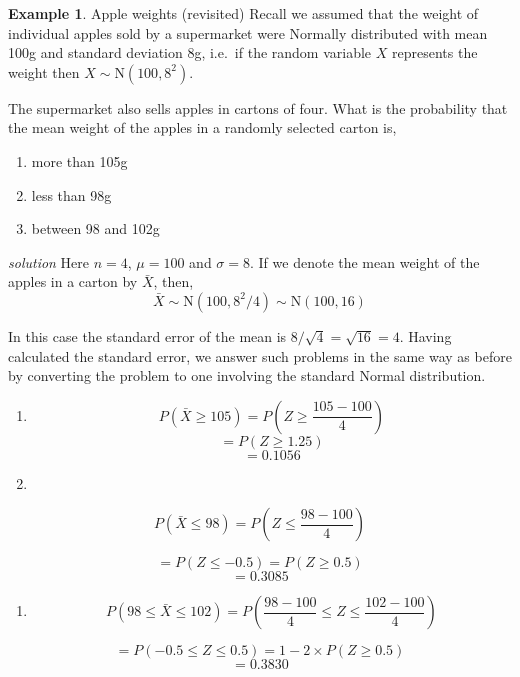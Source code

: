 \documentclass[
]{book}
\providecommand{\tightlist}{%
  \setlength{\itemsep}{0pt}\setlength{\parskip}{0pt}}
\theoremstyle{definition}
\theoremstyle{definition}
\newtheorem{example}{Example}[chapter]
\theoremstyle{definition}
\theoremstyle{definition}
\theoremstyle{remark}
\begin{document}
\begin{example}

Apple weights (revisited)
Recall we assumed that the weight of individual apples sold by a supermarket were Normally distributed
with mean 100g and standard deviation 8g, i.e.~if the random variable \(X\)
represents the weight then \(X \sim \text{N}({100},{8^2})\).

The supermarket also sells apples in cartons of four. What is the
probability that the mean weight of the apples in a randomly
selected carton is,

\begin{enumerate}
\def\labelenumi{\alph{enumi})}
\tightlist
\item
  more than 105g
\item
  less than 98g
\item
  between 98 and 102g
\end{enumerate}

\end{example}

\emph{solution}
Here \(n=4\), \(\mu=100\) and \(\sigma=8\). If we denote the mean weight
of the apples in a carton by \(\bar{X}\), then,
\[ \bar{X} \sim \text{N}({100},8^2/4) \sim \text{N}(100,16)\]

In this case the standard error of the mean is
\(8/\sqrt{4}=\sqrt{16}=4\). Having calculated the standard error, we
answer such problems in the same way as before by converting the
problem to one involving the standard Normal distribution.

\begin{enumerate}
\def\labelenumi{\alph{enumi})}
\item
  \[P(\bar{X} \geq 105)  =  P\left ( Z \geq \dfrac{105-100}{4}\right) \]
  \[=  P(Z\geq 1.25)\]
  \[=  0.1056\]
\item
\end{enumerate}

\[P(\bar{X} \leq 98)  =  P\left ( Z \leq \dfrac{98-100}{4}\right)\]

\[=  P(Z\leq -0.5)=P(Z\geq 0.5)\]
\[= 0.3085\]

\begin{enumerate}
\def\labelenumi{\alph{enumi})}
\setcounter{enumi}{2}
\tightlist
\item
  \[P(98\leq \bar{X} \leq 102)  = P\left (\dfrac{98-100}{4} \leq Z \leq \dfrac{102-100}{4}\right)\]
\end{enumerate}

\[=  P(-0.5\leq Z\leq 0.5)=1-2\times P(Z\geq 0.5)\]
\[=  0.3830\]
\end{document}
